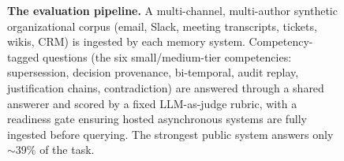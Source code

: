 \begin{figure}[t]
  \centering
  \resizebox{0.95\linewidth}{!}{}
  \caption{\textbf{The \bench{} evaluation pipeline.} A multi-channel, multi-author
    synthetic organizational corpus (email, Slack, meeting transcripts, tickets,
    wikis, CRM) is ingested by each memory system. Competency-tagged questions
    (the six small/medium-tier competencies: supersession, decision provenance,
    bi-temporal, audit replay, justification chains, contradiction) are answered
    through a shared answerer
    and scored by a fixed LLM-as-judge rubric, with a readiness gate ensuring hosted
    asynchronous systems are fully ingested before querying. The strongest public
    system answers only $\sim$$39\%$ of the task.}
  \label{fig:teaser}
\end{figure}
